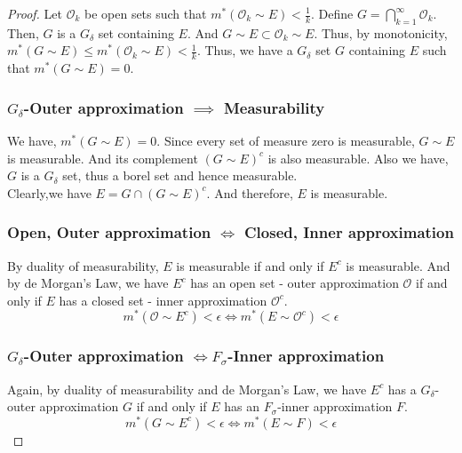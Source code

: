 \begin{proof}
	Let $\mathcal{O}_k$ be open sets such that $m^\ast(\mathcal{O}_k \sim E) < \frac{1}{k}$.
	Define $G = \displaystyle\bigcap_{k=1}^\infty \mathcal{O}_k$.
	Then, $G$ is a $G_\delta$ set containing $E$.
	And $G \sim E \subset \mathcal{O}_k \sim E$.
	Thus, by monotonicity, $m^\ast(G \sim E) \le m^\ast(\mathcal{O}_k \sim E) < \frac{1}{k}$.
	Thus, we have a $G_\delta$ set $G$ containing $E$ such that $m^\ast(G \sim E) = 0$.

\subsubsection*{$G_\delta$-Outer approximation $\implies$ Measurability}
	We have, $m^\ast(G \sim  E) = 0$.
	Since every set of measure zero is measurable, $G \sim E$ is measurable.
	And its complement $(G \sim E)^c$ is also measurable.
	Also we have, $G$ is a $G_\delta$ set, thus a borel set and hence measurable.\\

	Clearly,we have $E = G \cap (G \sim E)^c$.
	And therefore, $E$ is measurable.

\subsubsection*{Open, Outer approximation $\iff$ Closed, Inner approximation}
	By duality of measurability, $E$ is measurable if and only if $E^c$ is measurable.
	And by de Morgan's Law, we have $E^c$ has an open set - outer approximation $\mathcal{O}$ if and only if $E$ has a closed set - inner approximation $\mathcal{O}^c$.
	$$ m^\ast(\mathcal{O} \sim E^c) < \epsilon \iff m^\ast(E \sim \mathcal{O}^c) < \epsilon $$

\subsubsection*{$G_\delta$-Outer approximation $\iff F_\sigma$-Inner approximation}
	Again, by duality of measurability and de Morgan's Law, we have $E^c$ has a $G_\delta$-outer approximation $G$ if and only if $E$ has an $F_\sigma$-inner approximation $F$.
	$$ m^\ast(G \sim E^c) < \epsilon \iff m^\ast(E \sim F) < \epsilon $$
\end{proof}

